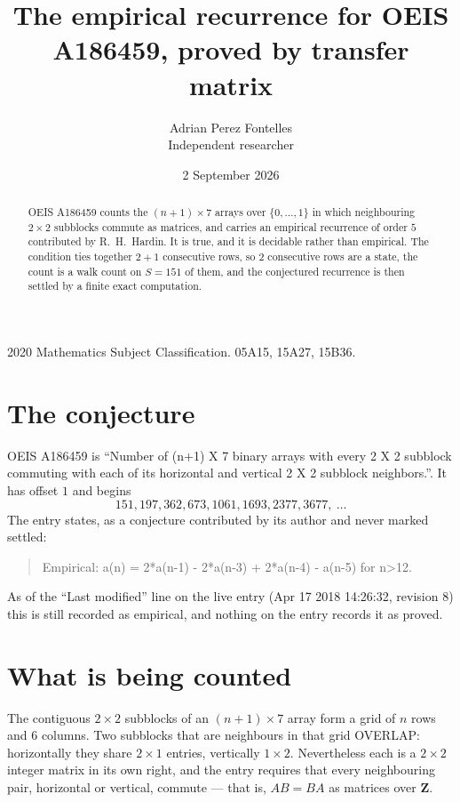 \documentclass[11pt,a4paper]{article}
\title{The empirical recurrence for OEIS A186459, proved by transfer matrix}
\author{Adrian Perez Fontelles\\ \small Independent researcher}
\date{2 September 2026}
\theoremstyle{plain}
\theoremstyle{definition}
\begin{document}
\maketitle

\begin{abstract}
OEIS A186459 counts the $(n+1)\times7$ arrays over $\{0,\dots,1\}$ in which
neighbouring $2\times2$ subblocks commute as matrices, and carries an empirical recurrence
of order $5$ contributed by R.~H.~Hardin. It is true, and it is decidable rather than
empirical. The condition ties together $2+1$ consecutive rows, so $2$ consecutive rows are
a state, the count is a walk count on $S=151$ of them, and the conjectured recurrence is then
settled by a finite exact computation.
\end{abstract}

\noindent\small 2020 Mathematics Subject Classification. 05A15, 15A27, 15B36.\normalsize

\section{The conjecture}

OEIS A186459 is ``Number of (n+1) X 7 binary arrays with every 2 X 2 subblock commuting with each of its horizontal and vertical 2 X 2 subblock neighbors.''. It has offset $1$ and begins
\[
151, 197, 362, 673, 1061, 1693, 2377, 3677,\ \dots
\]
The entry states, as a conjecture contributed by its author and never marked settled:
\begin{quote}
Empirical: a(n) = 2*a(n-1) - 2*a(n-3) + 2*a(n-4) - a(n-5) for n>12.
\end{quote}
As of the ``Last modified'' line on the live entry (Apr 17 2018 14:26:32, revision 8) this is still
recorded as empirical, and nothing on the entry records it as proved.

\section{What is being counted}

The contiguous $2\times2$ subblocks of an $(n+1)\times7$ array form a grid of $n$
rows and $6$ columns. Two subblocks that are neighbours in that
grid OVERLAP: horizontally they share $2\times1$ entries, vertically
$1\times2$. Nevertheless each is a $2\times2$ integer matrix in its own right, and
the entry requires that every neighbouring pair, horizontal or vertical, commute --- that is,
$AB=BA$ as matrices over $\mathbf{Z}$.
\end{document}
